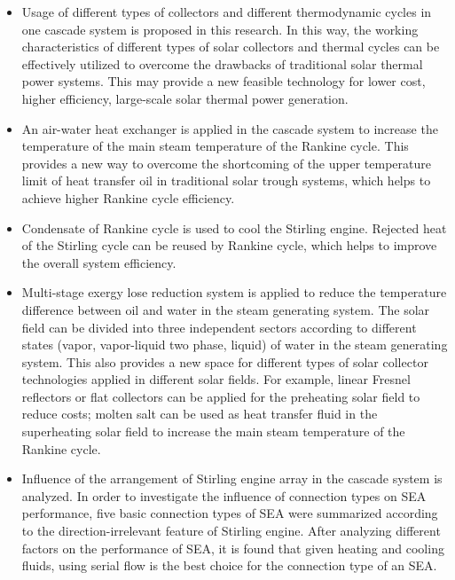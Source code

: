 \begin{itemize}
  \item Usage of different types of collectors and different thermodynamic cycles in one cascade system is proposed in this research. In this way, the working characteristics of different types of solar collectors and thermal cycles can be effectively utilized to overcome the drawbacks of traditional solar thermal power systems. This may provide a new feasible technology for lower cost, higher efficiency, large-scale solar thermal power generation.
  \item An air-water heat exchanger is applied in the cascade system to increase the temperature of the main steam temperature of the Rankine cycle. This provides a new way to overcome the shortcoming of the upper temperature limit of heat transfer oil in traditional solar trough systems, which helps to achieve higher Rankine cycle efficiency.
  \item Condensate of Rankine cycle is used to cool the Stirling engine. Rejected heat of the Stirling cycle can be reused by Rankine cycle, which helps to improve the overall system efficiency. 
  \item Multi-stage exergy lose reduction system is applied to reduce the temperature difference between oil and water in the steam generating system. The solar field can be divided into three independent sectors according to different states (vapor, vapor-liquid two phase, liquid) of water in the steam generating system. This also provides a new space for different types of solar collector technologies applied in different solar fields. For example, linear Fresnel reflectors or flat collectors can be applied for the preheating solar field to reduce costs; molten salt can be used as heat transfer fluid in the superheating solar field to increase the main steam temperature of the Rankine cycle.
  \item Influence of the arrangement of Stirling engine array in the cascade system is analyzed. In order to investigate the influence of connection types on SEA performance, five basic connection types of SEA were summarized according to the direction-irrelevant feature of Stirling engine. After
analyzing different factors on the performance of SEA, it is found that given heating and cooling fluids, using serial flow is the best choice for the connection type of an SEA.
\end{itemize}

\newpage
